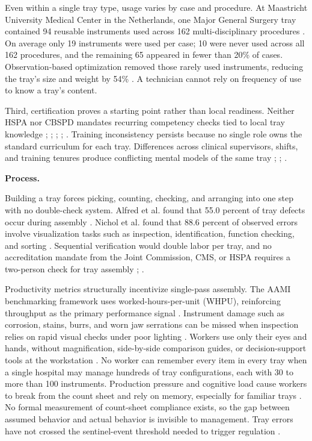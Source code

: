 \documentclass[10pt,a4paper]{article}
\begin{document}
Even within a single tray type, usage varies by case and procedure. At Maastricht University Medical Center in the Netherlands, one Major General Surgery tray contained 94 reusable instruments used across 162 multi-disciplinary procedures \cite{eussen-et-al-2026}. On average only 19 instruments were used per case; 10 were never used across all 162 procedures, and the remaining 65 appeared in fewer than 20\% of cases. Observation-based optimization removed those rarely used instruments, reducing the tray's size and weight by 54\% \cite{eussen-et-al-2026}. A technician cannot rely on frequency of use to know a tray's content.

Third, certification proves a starting point rather than local readiness.
Neither HSPA nor CBSPD mandates recurring competency checks tied to local tray
knowledge
\cite{hspa-crcst-accessed-2026};
\cite{ofstead-et-al-2023};
\cite{aorn-staffing-shortage-2025};
\cite{kovach-2012};
\cite{nadeau-2017}. Training inconsistency
persists because no single role owns the standard curriculum for each tray.
Differences across clinical supervisors, shifts, and training tenures produce conflicting
mental models of the same tray
\cite{alfred-et-al-2021};
\cite{hu-et-al-2024};
\cite{thurmond-2020}.

\textbf{Process.}

Building a tray forces picking, counting, checking, and arranging into one step
with no double-check system. Alfred et al. found that 55.0 percent of tray
defects occur during assembly
\cite{alfred-et-al-2021}. Nichol et al. found that
88.6 percent of observed errors involve visualization tasks such as inspection,
identification, function checking, and sorting
\cite{nichol-et-al-2024}. Sequential
verification would double labor per tray, and no accreditation mandate from the
Joint Commission, CMS, or HSPA requires a two-person check for tray assembly
\cite{alfred-et-al-2021};
\cite{chen-et-al-2023}.

Productivity metrics structurally incentivize single-pass assembly. The AAMI
benchmarking framework uses worked-hours-per-unit (WHPU), reinforcing throughput
as the primary performance signal
\cite{kusler-jensen-spd-benchmarking-2023}.
Instrument damage such as corrosion, stains, burrs, and worn jaw serrations can
be missed when inspection relies on rapid visual checks under poor lighting
\cite{lind-2026a}. Workers use only their eyes and hands, without magnification,
side-by-side comparison guides, or decision-support tools at the workstation
\cite{nichol-et-al-2024}. No worker can remember every item in every tray when a
single hospital may manage hundreds of tray configurations, each with 30 to more
than 100 instruments. Production pressure and cognitive load cause workers to
break from the count sheet and rely on memory, especially for familiar trays
\cite{nadeau-2024}. No formal measurement of count-sheet compliance exists, so
the gap between assumed behavior and actual behavior is invisible to management.
Tray errors have not crossed the sentinel-event threshold needed to trigger
regulation \cite{joint-commission-sentinel-event-2024}.
\end{document}
